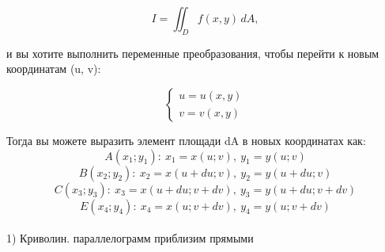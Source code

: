 \documentclass{article}
\begin{document}
\[I = \iint_D f(x, y) \, dA,\]

и вы хотите выполнить переменные преобразования, чтобы перейти к новым координатам (u, v):

\[\begin{cases} u = u(x, y) \\ v = v(x, y) \end{cases}\]

Тогда вы можете выразить элемент площади dA в новых координатах как:
\begin{equation*}
    A(x_1; y_1):\ x_1 = x(u;v),\ y_1 = y(u;v)
\end{equation*}
\begin{equation*}
    B(x_2; y_2):\ x_2 = x(u+du;v),\ y_2 = y(u+du;v)
\end{equation*}
\begin{equation*}
    C(x_3; y_3):\ x_3 = x(u+du;v+dv),\ y_3 = y(u+du;v+dv)
\end{equation*}
\begin{equation*}
    E(x_4; y_4):\ x_4 = x(u;v+dv),\ y_4 = y(u;v+dv)
\end{equation*}
\\


1) Криволин. параллелограмм приблизим прямыми
\end{document}
